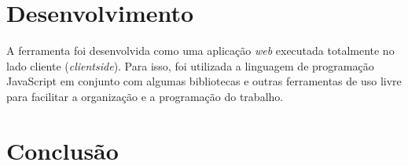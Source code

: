 \documentclass[12pt]{article}
\begin{document}
\section{Desenvolvimento}

A ferramenta foi desenvolvida como uma aplicação \textit{web} executada totalmente no lado cliente (\textit{clientside}).
Para isso, foi utilizada a linguagem de programação JavaScript em conjunto com algumas bibliotecas e outras ferramentas
de uso livre para facilitar a organização e a programação do trabalho.


\section{Conclusão}

\end{document}
